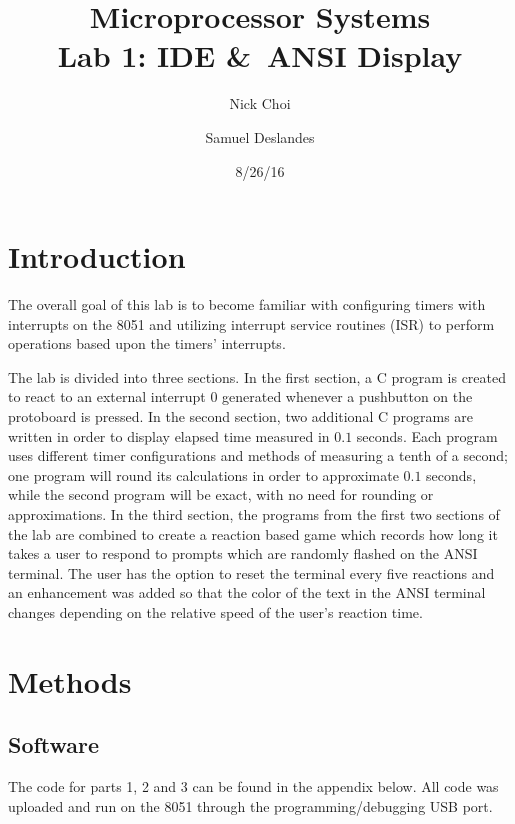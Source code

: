 \documentclass[12pt]{article}
\begin{document}
\title{Microprocessor Systems\\ Lab 1: IDE \&\ ANSI Display}
\author{Nick Choi \and Samuel Deslandes}
\date{8/26/16}
\maketitle
\pagebreak
\section{Introduction}
The overall goal of this lab is to become familiar with configuring timers with interrupts on the 8051 and utilizing interrupt service routines (ISR) to perform operations based upon the timers’ interrupts. 

The lab is divided into three sections. In the first section, a C program is created to react to an external interrupt 0 generated whenever a pushbutton on the protoboard is pressed. In the second section, two additional C programs are written in order to display elapsed time measured in $0.1$ seconds. Each program uses different timer configurations and methods of measuring a tenth of a second; one program will round its calculations in order to approximate $0.1$ seconds, while the second program will be exact, with no need for rounding or approximations. In the third section, the programs from the first two sections of the lab are combined to create a reaction based game which records how long it takes a user to respond to prompts which are randomly flashed on the ANSI terminal. The user has the option to reset the terminal every five reactions and an enhancement was added so that the color of the text in the ANSI terminal changes depending on the relative speed of the user's reaction time. 
 

\section{Methods}
\subsection{Software}
The code for parts 1, 2 and 3 can be found in the appendix below. All code was uploaded and run on the 8051 through the programming/debugging USB port. 	
\end{document}
